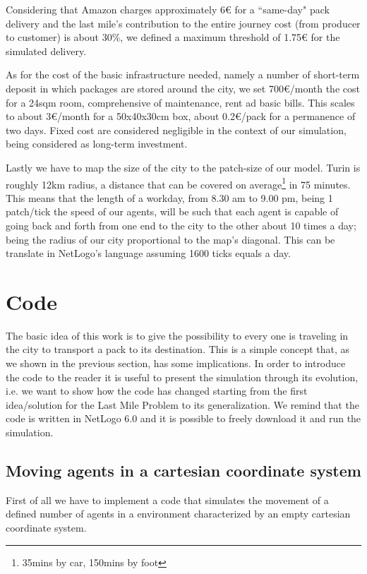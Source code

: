 \documentclass[11pt,a4paper]{article}
\begin{document}
Considering that Amazon charges approximately 6\euro{} for a “same-day" pack delivery and the last mile's contribution to the entire journey cost (from producer to customer) is about 30\%, we defined a maximum threshold of 1.75\euro{} for the simulated delivery.

As for the cost of the basic infrastructure needed, namely a number of short-term deposit in which packages are stored around the city, we set 700\euro{}/month the cost for a 24sqm room, comprehensive of maintenance, rent ad basic bills. This scales to about 3\euro{}/month for a 50x40x30cm box, about 0.2\euro{}/pack for a permanence of two days. Fixed cost are considered negligible in the context of our simulation, being considered as long-term investment.

Lastly we have to map the size of the city to the patch-size of our model. Turin is roughly 12km radius, a distance that can be covered on average\footnote{35mins by car, 150mins by foot} in 75 minutes. This means that the length of a workday, from 8.30 am to 9.00 pm, being 1 patch/tick the speed of our agents, will be such that each agent is capable of going back and forth from one end to the city to the other about 10 times a day; being the radius of our city proportional to the map's diagonal. This can be translate in NetLogo's language assuming 1600 ticks equals a day.

\newpage 
\section{Code}
The basic idea of this work is to give the possibility to every one is traveling in the city to transport a pack to its destination. 
This is a simple concept that, as we shown in the previous section, has some implications. In order to introduce the code to the reader it is useful to present the simulation through its evolution, i.e. we want to show how the code has changed starting from the first idea/solution for the Last Mile Problem to its generalization. 
We remind that the code is written in NetLogo 6.0 and it is possible to freely download it and run the simulation.


\subsection{Moving agents in a cartesian coordinate system}
First of all we have to implement a code that simulates the movement of a defined number of agents in a environment characterized by an empty cartesian coordinate system. 
\end{document}
